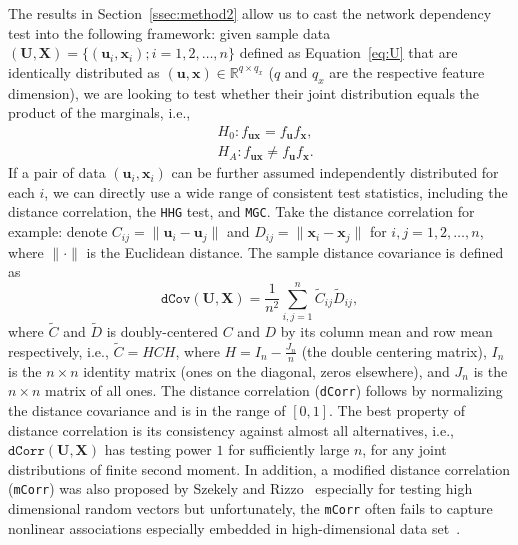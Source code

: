 \documentclass[11pt]{article}
\theoremstyle{definition}
\begin{document}
	The results in Section~\ref{ssec:method2} allow us to cast the network dependency test into the following framework: given sample data $(\mathbf{U}, \mathbf{X}) = \{  (\mathbf{u}_{i}, \mathbf{x}_{i} ) ; i = 1,2, \ldots, n \}$ defined as Equation~\ref{eq:U} that are identically distributed as $(\mathbf{u},\mathbf{x}) \in \mathbb{R}^{q \times q_x}$ ($q$ and $q_x$ are the respective feature dimension), we are looking to test whether their joint distribution equals the product of the marginals, i.e.,
	\begin{align*}
	& H_{0}: f_{\mathbf{u}\mathbf{x}}=f_{\mathbf{u}}f_{\mathbf{x}},\\
	& H_{A}: f_{\mathbf{u}\mathbf{x}}\neq f_{\mathbf{u}}f_{\mathbf{x}}.
	\end{align*}
	If a pair of data $(\mathbf{u}_{i}, \mathbf{x}_{i} )$ can be further assumed independently distributed for each $i$, we can directly use a wide range of consistent test statistics, including the distance correlation, the \texttt{HHG} test, and \texttt{MGC}. Take the distance correlation for example: denote $C_{ij} = \parallel \mathbf{u}_{i} - \mathbf{u}_{j} \parallel$ and $D_{ij} = \parallel \mathbf{x}_{i} - \mathbf{x}_{j} \parallel$ for $i,j=1,2, \ldots ,n$, where $\parallel \cdot \parallel$ is the Euclidean distance. The sample distance covariance is defined as 
	\begin{equation}	 
	\label{eq:dCov}
	\texttt{dCov}(\mathbf{U}, \mathbf{X}) = \frac{1}{n^2} \sum\limits_{i,j=1}^{n} \tilde{C}_{ij} \tilde{D}_{ij},
	\end{equation}
	where $\tilde{C}$ and $\tilde{D}$ is doubly-centered $C$ and $D$ by its column mean and row mean respectively, i.e., $\tilde{C}=HCH$, where $H=I_{n}-\frac{J_{n}}{n}$ (the double centering matrix), $I_n$ is the $n \times n$ identity matrix (ones on the diagonal, zeros elsewhere), and $J_n$ is the $n \times n$ matrix of all ones. The distance correlation (\texttt{dCorr}) follows by normalizing the distance covariance and is in the range of $[0,1]$. The best property of distance correlation is its consistency against almost all alternatives, i.e., $\texttt{dCorr}(\mathbf{U}, \mathbf{X})$ has testing power $1$ for sufficiently large $n$, for any joint distributions of finite second moment. In addition, a modified distance correlation (\texttt{mCorr}) was also proposed by Szekely and Rizzo~\cite{szekely2013distance} especially for testing high dimensional random vectors but unfortunately, the \texttt{mCorr} often fails to capture nonlinear associations especially embedded in high-dimensional data set~\citep{shen2016discovering, heller2012consistent}. 
	
\end{document}
